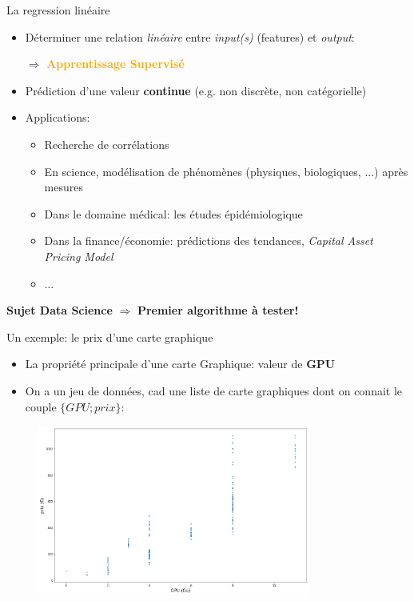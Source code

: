 \documentclass[11pt]{beamer}
\begin{document}
\begin{frame}{La regression linéaire}
  \begin{itemize}
    
  \item Déterminer une relation \textit{linéaire} entre \textit{input(s)} (features) et \textit{output}:
    \begin{center}
      \normalsize
      \boldmath $\Rightarrow$ \unboldmath \textbf{\textcolor{orange}{Apprentissage Supervisé}}
    \end{center}
  \item Prédiction d'une valeur \textbf{continue} (e.g. non discrète, non catégorielle)
  \item Applications:
    \begin{itemize}
      \normalsize
    \item Recherche de corrélations
    \item En science, modélisation de phénomènes (physiques, biologiques, ...) après mesures
    \item Dans le domaine médical: les études épidémiologique
    \item Dans la finance/économie: prédictions des tendances, \textit{Capital Asset Pricing Model}
    \item $\dots$
    \end{itemize}
  \end{itemize}
  \begin{center}
    \textbf{Sujet Data Science} \boldmath $\Rightarrow$ \unboldmath \textbf{Premier algorithme à tester!}
  \end{center}
\end{frame}

\begin{frame}{Un exemple: le prix d'une carte graphique}
  \begin{itemize}
  \item La propriété principale d'une carte Graphique: valeur de \textbf{GPU}
    \vspace{0.2cm}
  \item On a un jeu de données, cad une liste de carte graphiques dont on connait le couple $\{GPU;prix\}$:
  \end{itemize}

  \begin{figure}
    \includegraphics[width=0.8\textwidth]{figs/gpuPrices.png}    
  \end{figure}
\end{frame}
\end{document}
